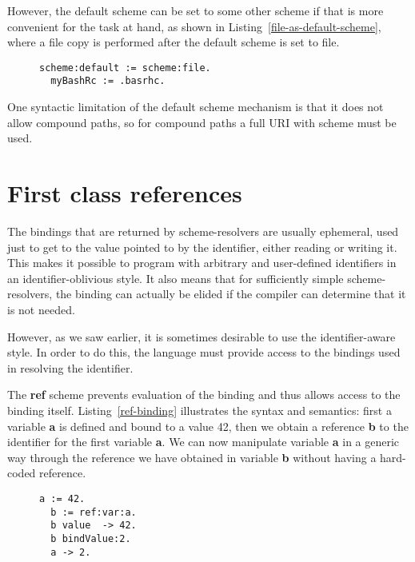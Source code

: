 \documentclass[preprint,authoryear]{acm_proc_article-sp}
\begin{document}
However, the default scheme can be set to some other scheme if that is more
convenient for the task at hand, as shown in Listing~\ref{file-as-default-scheme},
where a file copy is performed after the default scheme is set to file.


\begin{figure}[htbp]
\begin{lstlisting}[style=L,label=file-as-default-scheme,caption=File copy with file: as default scheme.]
  scheme:default := scheme:file.
  myBashRc := .basrhc.
\end{lstlisting}
\end{figure}

One syntactic limitation of the default scheme mechanism is that it does not allow
compound paths, so for compound paths a full URI with scheme must be used.




\section{First class references}

The bindings that are returned by scheme-resolvers are usually ephemeral, used just 
to get to the value pointed to by the identifier, either reading or writing it.  This
makes it possible to program with arbitrary and user-defined identifiers in
an identifier-oblivious style.  It also means that for sufficiently simple scheme-resolvers,
the binding can actually be elided if the compiler can determine that it is not needed.

However, as we saw earlier, it is sometimes
desirable to use the identifier-aware style.  In order to do this, the language
must provide access to the bindings used in resolving the identifier.

The {\bf ref} scheme prevents evaluation of the binding and thus allows access
to the binding itself.  Listing~\ref{ref-binding} illustrates the syntax and semantics:
first a variable {\bf a} is defined and bound to a value 42, then we obtain a reference {\bf b} to
the identifier for the first variable {\bf a}.  We can now manipulate variable {\bf a} 
in a generic way through the reference we have obtained in variable {\bf b} without
having a hard-coded reference. 


\begin{figure}[htbp]
\begin{lstlisting}[style=L,label=ref-binding,caption=Accessing a variable via its binding.]
  a := 42.
  b := ref:var:a.
  b value  -> 42.
  b bindValue:2.
  a -> 2.
\end{lstlisting}
\end{figure}
\end{document}
